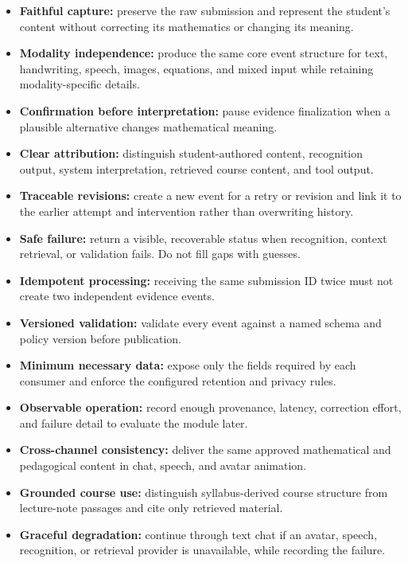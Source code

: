 \documentclass[11pt]{article}
\begin{document}
\begin{itemize}
    \item \textbf{Faithful capture:} preserve the raw submission and represent the student's content without correcting its mathematics or changing its meaning.
    \item \textbf{Modality independence:} produce the same core event structure for text, handwriting, speech, images, equations, and mixed input while retaining modality-specific details.
    \item \textbf{Confirmation before interpretation:} pause evidence finalization when a plausible alternative changes mathematical meaning.
    \item \textbf{Clear attribution:} distinguish student-authored content, recognition output, system interpretation, retrieved course content, and tool output.
    \item \textbf{Traceable revisions:} create a new event for a retry or revision and link it to the earlier attempt and intervention rather than overwriting history.
    \item \textbf{Safe failure:} return a visible, recoverable status when recognition, context retrieval, or validation fails. Do not fill gaps with guesses.
    \item \textbf{Idempotent processing:} receiving the same submission ID twice must not create two independent evidence events.
    \item \textbf{Versioned validation:} validate every event against a named schema and policy version before publication.
    \item \textbf{Minimum necessary data:} expose only the fields required by each consumer and enforce the configured retention and privacy rules.
    \item \textbf{Observable operation:} record enough provenance, latency, correction effort, and failure detail to evaluate the module later.
    \item \textbf{Cross-channel consistency:} deliver the same approved mathematical and pedagogical content in chat, speech, and avatar animation.
    \item \textbf{Grounded course use:} distinguish syllabus-derived course structure from lecture-note passages and cite only retrieved material.
    \item \textbf{Graceful degradation:} continue through text chat if an avatar, speech, recognition, or retrieval provider is unavailable, while recording the failure.
\end{itemize}
\end{document}

